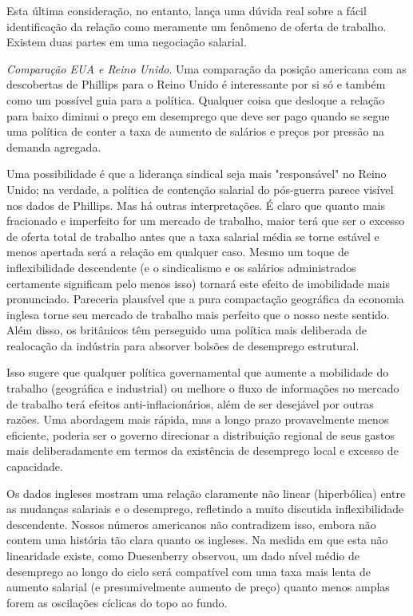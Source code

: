 \documentclass[12pt]{article}
\begin{document}
Esta última consideração, no entanto, lança uma dúvida real sobre a fácil identificação da relação como meramente um fenômeno de oferta de trabalho. Existem duas partes em uma negociação salarial.

\textit{Comparação EUA e Reino Unido}. Uma comparação da posição americana com as descobertas de Phillips para o Reino Unido é interessante por si só e também como um possível guia para a política. Qualquer coisa que desloque a relação para baixo diminui o preço em desemprego que deve ser pago quando se segue uma política de conter a taxa de aumento de salários e preços por pressão na demanda agregada.

Uma possibilidade é que a liderança sindical seja mais "responsável" no Reino Unido; na verdade, a política de contenção salarial do pós-guerra parece visível nos dados de Phillips. Mas há outras interpretações. É claro que quanto mais fracionado e imperfeito for um mercado de trabalho, maior terá que ser o excesso de oferta total de trabalho antes que a taxa salarial média se torne estável e menos apertada será a relação em qualquer caso. Mesmo um toque de inflexibilidade descendente (e o sindicalismo e os salários administrados certamente significam pelo menos isso) tornará este efeito de imobilidade mais pronunciado. Pareceria plausível que a pura compactação geográfica da economia inglesa torne seu mercado de trabalho mais perfeito que o nosso neste sentido. Além disso, os britânicos têm perseguido uma política mais deliberada de realocação da indústria para absorver bolsões de desemprego estrutural.

Isso sugere que qualquer política governamental que aumente a mobilidade do trabalho (geográfica e industrial) ou melhore o fluxo de informações no mercado de trabalho terá efeitos anti-inflacionários, além de ser desejável por outras razões. Uma abordagem mais rápida, mas a longo prazo provavelmente menos eficiente, poderia ser o governo direcionar a distribuição regional de seus gastos mais deliberadamente em termos da existência de desemprego local e excesso de capacidade.

Os dados ingleses mostram uma relação claramente não linear (hiperbólica) entre as mudanças salariais e o desemprego, refletindo a muito discutida inflexibilidade descendente. Nossos números americanos não contradizem isso, embora não contem uma história tão clara quanto os ingleses. Na medida em que esta não linearidade existe, como Duesenberry observou, um dado nível médio de desemprego ao longo do ciclo será compatível com uma taxa mais lenta de aumento salarial (e presumivelmente aumento de preço) quanto menos amplas forem as oscilações cíclicas do topo ao fundo.
\end{document}
